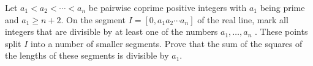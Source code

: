 Let 
$a_1 < a_2 <  \cdots <a_n$
 be pairwise coprime positive integers with 
$a_1$
 being prime and 
$a_1 \ge n + 2$.
 On the segment 
$I = [0, a_1 a_2  \cdots a_n ]$
 of the real line, mark all integers that are divisible by at least one of the numbers 
$a_1 ,   \ldots , a_n$
 . These points split 
$I$
 into a number of smaller segments. Prove that the sum of the squares of the lengths of these segments is divisible by 
$a_1$.
